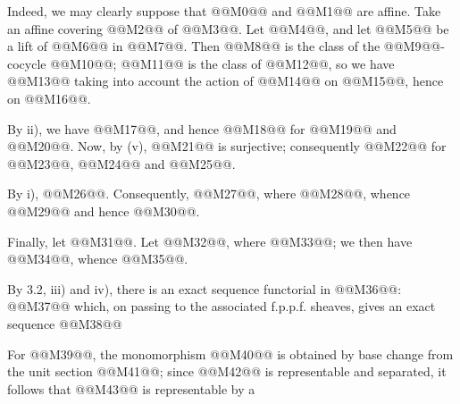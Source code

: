 Indeed, we may clearly suppose that @@M0@@ and @@M1@@ are affine. Take an affine covering @@M2@@ of @@M3@@. Let @@M4@@, and let @@M5@@ be a lift of @@M6@@ in @@M7@@. Then @@M8@@ is the class of the @@M9@@-cocycle @@M10@@; @@M11@@ is the class of @@M12@@, so we have
@@M13@@
taking into account the action of @@M14@@ on @@M15@@, hence on @@M16@@.

By ii), we have @@M17@@, and hence @@M18@@ for @@M19@@ and @@M20@@. Now, by (v), @@M21@@ is surjective; consequently @@M22@@ for @@M23@@, @@M24@@ and @@M25@@.

By i), @@M26@@. Consequently, @@M27@@, where @@M28@@, whence @@M29@@ and hence @@M30@@.

Finally, let @@M31@@. Let @@M32@@, where @@M33@@; we then have @@M34@@, whence @@M35@@.

By 3.2, iii) and iv), there is an exact sequence functorial in @@M36@@:
@@M37@@
which, on passing to the associated f.p.p.f. sheaves, gives an exact sequence
@@M38@@

For @@M39@@, the monomorphism @@M40@@ is obtained by base change from the unit section @@M41@@; since @@M42@@ is representable and separated, it follows that @@M43@@ is representable by a

